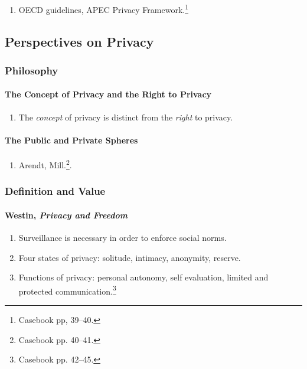 \begin{enumerate}
    \item OECD guidelines, APEC Privacy Framework.\footnote{Casebook pp, 
    39--40.}
\end{enumerate}

\subsection{Perspectives on Privacy}

\subsubsection{Philosophy}

\paragraph{The Concept of Privacy and the Right to Privacy}

\begin{enumerate}
    \item The \emph{concept} of privacy is distinct from the \emph{right} to 
    privacy.
\end{enumerate}

\paragraph{The Public and Private Spheres}

\begin{enumerate}
    \item Arendt, Mill.\footnote{Casebook pp. 40--41.}.
\end{enumerate}

\subsubsection{Definition and Value}

\paragraph{Westin, \emph{Privacy and Freedom}}

\begin{enumerate}
    \item Surveillance is necessary in order to enforce social norms.
    \item Four states of privacy: solitude, intimacy, anonymity, reserve.
    \item Functions of privacy: personal autonomy, self evaluation, limited 
    and protected communication.\footnote{Casebook pp. 42--45.}
\end{enumerate}

